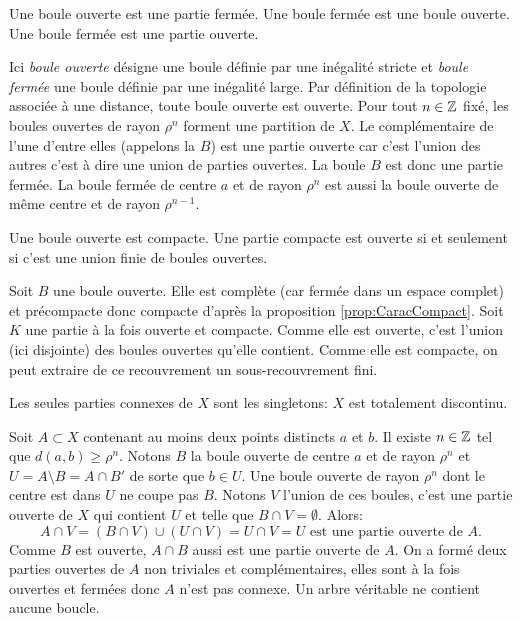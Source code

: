 \begin{propn}
 Une boule ouverte est une partie fermée.  Une boule fermée est une boule ouverte. Une boule fermée est une partie ouverte.
\end{propn}
\begin{demo}
 Ici \emph{boule ouverte} désigne une boule définie par une inégalité stricte et \emph{boule fermée} une boule définie par une inégalité large.
 Par définition de la topologie associée à une distance, toute boule ouverte est ouverte. Pour tout $n\in \mathbb{Z}$ fixé, les boules ouvertes de rayon $\rho^n$ forment une partition de $X$. Le complémentaire de l'une d'entre elles (appelons la $B$) est une partie ouverte car c'est l'union des autres c'est à dire une union de parties ouvertes. La boule $B$ est donc une partie fermée.\newline
 La boule fermée de centre $a$ et de rayon $\rho^n$ est aussi la boule ouverte de même centre et de rayon $\rho^{n-1}$.
\end{demo}

\begin{propn}\label{Prop:OuvertCompct}
 Une boule ouverte est compacte. Une partie compacte est ouverte si et seulement si c'est une union finie de boules ouvertes.
\end{propn}
\begin{demo}
 Soit $B$ une boule ouverte. Elle est complète (car fermée dans un espace complet) et précompacte donc compacte d'après la proposition \ref{prop:CaracCompact}.\newline
 Soit $K$ une partie à la fois ouverte et compacte. Comme elle est ouverte, c'est l'union (ici disjointe) des boules ouvertes qu'elle contient. Comme elle est compacte, on peut extraire de ce recouvrement un sous-recouvrement fini.
\end{demo}

\begin{prop}
 Les seules parties connexes de $X$ sont les singletons: $X$ est totalement discontinu.
\end{prop}
\begin{demo}
 Soit $A\subset X$ contenant au moins deux points distincts $a$ et $b$. Il existe $n\in \mathbb{Z}$ tel que $d(a,b) \geq \rho^n$.\newline
 Notons $B$ la boule ouverte de centre $a$ et de rayon $\rho^n$ et $U=A\setminus B = A \cap B'$ de sorte que $b\in U$. Une boule ouverte de rayon $\rho^n$ dont le centre est dans $U$ ne coupe pas $B$. Notons $V$ l'union de ces boules, c'est une partie ouverte de $X$ qui contient $U$ et telle que $B\cap V = \emptyset$. Alors:
 \begin{displaymath}
  A \cap V  = (B \cap V) \cup (U \cap V) = U \cap V = U \text{ est une partie ouverte de } A.
 \end{displaymath}
Comme $B$ est ouverte, $A\cap B$ aussi est une partie ouverte de $A$. On a formé deux parties ouvertes de $A$ non triviales et complémentaires, elles sont à la fois ouvertes et fermées donc $A$ n'est pas connexe. Un arbre véritable ne contient aucune boucle.
\end{demo}

